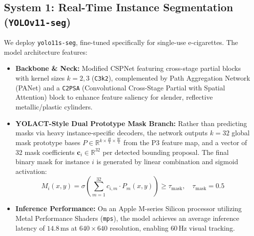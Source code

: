 \documentclass[10pt,a4paper]{article}
\begin{document}
\subsection{System 1: Real-Time Instance Segmentation (\texttt{YOLOv11-seg})}
We deploy \texttt{yolo11s-seg}, fine-tuned specifically for single-use e-cigarettes. The model architecture features:
\begin{itemize}
    \item \textbf{Backbone \& Neck:} Modified CSPNet featuring cross-stage partial blocks with kernel sizes $k=2,3$ (\texttt{C3k2}), complemented by Path Aggregation Network (PANet) and a \texttt{C2PSA} (Convolutional Cross-Stage Partial with Spatial Attention) block to enhance feature saliency for slender, reflective metallic/plastic cylinders.
    \item \textbf{YOLACT-Style Dual Prototype Mask Branch:} Rather than predicting masks via heavy instance-specific decoders, the network outputs $k=32$ global mask prototype bases $P \in \mathbb{R}^{k \times \frac{H}{4} \times \frac{W}{4}}$ from the P3 feature map, and a vector of 32 mask coefficients $\mathbf{c}_i \in \mathbb{R}^{32}$ per detected bounding proposal. The final binary mask for instance $i$ is generated by linear combination and sigmoid activation:
    \begin{equation}
        M_i(x, y) = \sigma\left( \sum_{m=1}^{32} c_{i,m} \cdot P_m(x, y) \right) \ge \tau_{\text{mask}}, \quad \tau_{\text{mask}} = 0.5
    \end{equation}
    \item \textbf{Inference Performance:} On an Apple M-series Silicon processor utilizing Metal Performance Shaders (\texttt{mps}), the model achieves an average inference latency of $14.8\,\text{ms}$ at $640\times640$ resolution, enabling $60\,\text{Hz}$ visual tracking.
\end{itemize}

\newpage
\end{document}
